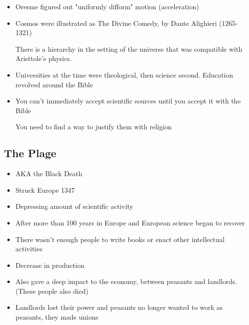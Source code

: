 \documentclass{article}
\begin{document}
\begin{itemize}
  \item Oresme figured out "uniformly difform" motion (acceleration)
  \item Cosmos were illustrated as The Divine Comedy,
    by Dante Alighieri (1265-1321)

    There is a hierarchy in the setting of the universe that
    was compatible with Aristtole's physics.
  \item Universities at the time were theological,
    then science second. Education revolved around the Bible
  \item You can't immediately accept scientific
    sources until you accept it with the Bible

    You need to find a way to justify them with
    religion
\end{itemize}

\subsection{The Plage}
\begin{itemize}
  \item AKA the Black Death
  \item Struck Europe 1347
  \item Depressing amount of scientific activity
  \item After more than 100 years in Europe and European science began to recover
  \item There wasn't enough people to write books or
    enact other intellectual activities
  \item Decrease in production
  \item Also gave a deep impact to the economy,
    between peasants and landlords. (These people also died)

  \item Landlords lost their power and peasants no longer wanted to work as peasants,
    they made unions
\end{itemize}
\end{document}
